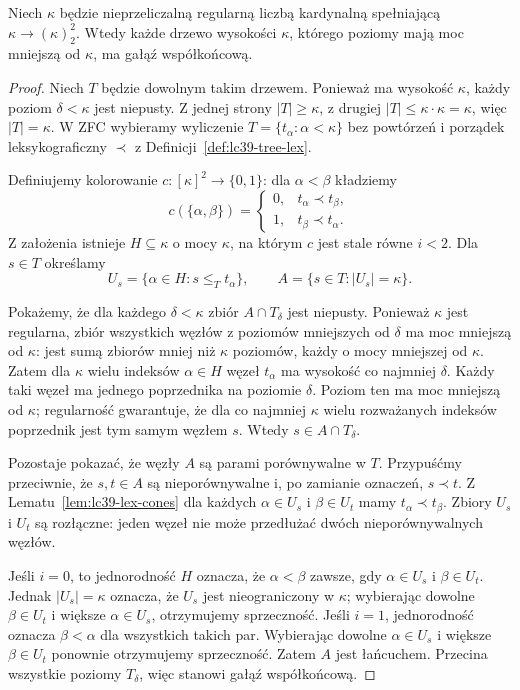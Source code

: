 \begin{twierdzenie}
\label{thm:lc39-partition-to-tree}
Niech $\kappa$ będzie nieprzeliczalną
regularną liczbą kardynalną
spełniającą
$\kappa\longrightarrow(\kappa)^2_2$.
Wtedy każde drzewo wysokości
$\kappa$, którego poziomy mają
moc mniejszą od $\kappa$,
ma gałąź współkońcową.
\end{twierdzenie}
\begin{proof}
Niech $T$ będzie dowolnym
takim drzewem. Ponieważ
ma wysokość $\kappa$,
każdy poziom $\delta<\kappa$
jest niepusty. Z jednej strony
$|T|\ge\kappa$, z drugiej
$|T|\le\kappa\cdot\kappa=\kappa$,
więc $|T|=\kappa$.
W ZFC wybieramy wyliczenie
$T=\{t_\alpha:\alpha<\kappa\}$
bez powtórzeń i porządek
leksykograficzny $\prec$
z Definicji~\ref{def:lc39-tree-lex}.

Definiujemy kolorowanie
$c:[\kappa]^2\to\{0,1\}$:
dla $\alpha<\beta$ kładziemy
\[
 c(\{\alpha,\beta\})=
 \begin{cases}
 0,&t_\alpha\prec t_\beta,\\
 1,&t_\beta\prec t_\alpha.
 \end{cases}
\]
Z założenia istnieje
$H\subseteq\kappa$ o mocy
$\kappa$, na którym $c$
jest stale równe $i<2$.
Dla $s\in T$ określamy
\[
 U_s=\{\alpha\in H:s\le_T t_\alpha\},
 \qquad
 A=\{s\in T:|U_s|=\kappa\}.
\]

Pokażemy, że dla każdego
$\delta<\kappa$ zbiór
$A\cap T_\delta$ jest niepusty.
Ponieważ $\kappa$ jest regularna,
zbiór wszystkich węzłów z
poziomów mniejszych od $\delta$
ma moc mniejszą od $\kappa$:
jest sumą zbiorów mniej niż
$\kappa$ poziomów, każdy
o mocy mniejszej od $\kappa$.
Zatem dla $\kappa$ wielu
indeksów $\alpha\in H$
węzeł $t_\alpha$ ma
wysokość co najmniej $\delta$.
Każdy taki węzeł ma jednego
poprzednika na poziomie $\delta$.
Poziom ten ma moc mniejszą
od $\kappa$; regularność
gwarantuje, że dla co najmniej
$\kappa$ wielu rozważanych
indeksów poprzednik jest
tym samym węzłem $s$.
Wtedy $s\in A\cap T_\delta$.

Pozostaje pokazać, że
węzły $A$ są parami
porównywalne w $T$.
Przypuśćmy przeciwnie,
że $s,t\in A$ są
nieporównywalne i,
po zamianie oznaczeń,
$s\prec t$.
Z Lematu~\ref{lem:lc39-lex-cones}
dla każdych
$\alpha\in U_s$ i
$\beta\in U_t$ mamy
$t_\alpha\prec t_\beta$.
Zbiory $U_s$ i $U_t$
są rozłączne: jeden węzeł
nie może przedłużać dwóch
nieporównywalnych węzłów.

Jeśli $i=0$, to jednorodność
$H$ oznacza, że
$\alpha<\beta$ zawsze, gdy
$\alpha\in U_s$ i
$\beta\in U_t$.
Jednak $|U_s|=\kappa$
oznacza, że $U_s$ jest
nieograniczony w $\kappa$;
wybierając dowolne
$\beta\in U_t$ i większe
$\alpha\in U_s$, otrzymujemy
sprzeczność.
Jeśli $i=1$, jednorodność
oznacza $\beta<\alpha$
dla wszystkich takich par.
Wybierając dowolne
$\alpha\in U_s$ i większe
$\beta\in U_t$ ponownie
otrzymujemy sprzeczność.
Zatem $A$ jest łańcuchem.
Przecina wszystkie poziomy
$T_\delta$, więc stanowi
gałąź współkońcową.
\end{proof}

